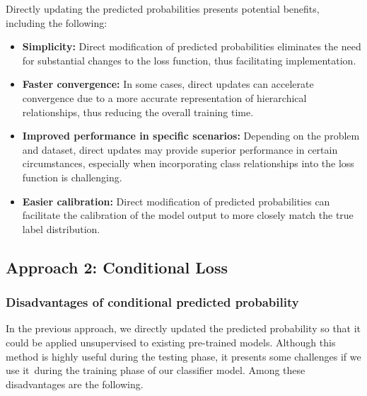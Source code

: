 \documentclass[preprint,3p,times, review]{elsarticle}
\begin{document}
Directly updating the predicted probabilities presents potential benefits, including the following:

\begin{itemize}

    \item  \textbf{Simplicity:} Direct modification of predicted probabilities eliminates the need for substantial changes to the loss function, thus facilitating implementation.

    \item  \textbf{Faster convergence:} In some cases, direct updates can accelerate convergence due to a more accurate representation of hierarchical relationships, thus reducing the overall training time.

    \item  \textbf{Improved performance in specific scenarios:} Depending on the problem and dataset, direct updates may provide superior performance in certain circumstances, especially when incorporating class relationships into the loss function is challenging.

    \item  \textbf{Easier calibration:} Direct modification of predicted probabilities can facilitate the calibration of the model output to more closely match the true label distribution.

\end{itemize}


\subsection{Approach 2: Conditional Loss}

\subsubsection{Disadvantages of conditional predicted probability}

In the previous approach, we directly updated the predicted probability so that it could be applied unsupervised to existing pre-trained models. Although this method is highly useful during the testing phase, it presents some challenges if we use it~during the training phase of our classifier model. Among these disadvantages are the following.
\end{document}
